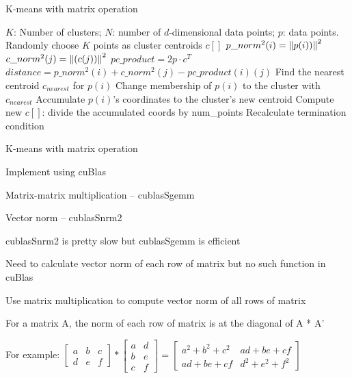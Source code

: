 \documentclass[
nopagebreaks,
style=klope,
fleqn]{powerdot}
\begin{document}
\begin{slide}{K-means with matrix operation}
  \scriptsize
  \begin{algorithmic}[1]
    \INPUT $K$: Number of clusters; $N$: number of $d$-dimensional data points; $p$: data points.
     \label{alg:pm}
    \State Randomly choose $K$ points as cluster centroids $c[]$
    \State $p\_norm^2(i) = \left\lVert p(i))\right\rVert^2$
    \EndFor
    \State $c\_norm^2(j) = \left\lVert(c(j))\right\rVert^2$
    \EndFor
    \State $pc\_product = 2 p \cdot c^T$
    \State $distance = p\_norm^2(i) + c\_norm^2(j) - pc\_product(i)(j)$
    \EndFor
    \State Find the nearest centroid $c_{nearest}$ for $p(i)$
    \State Change membership of $p(i)$ to the cluster with $c_{nearest}$
    \State Accumulate $p(i)$'s coordinates to the cluster's new centroid
    \EndParFor
    \State Compute new $c[]$: divide the accumulated coords by num\_points
    \State Recalculate termination condition
    \EndWhile
    \EndFunction
  \end{algorithmic}
\end{slide}

\begin{slide}{K-means with matrix operation}
  \begin{compactitem}
  \item{Implement using cuBlas}
  \item{Matrix-matrix multiplication -- cublasSgemm}
  \item{Vector norm -- cublasSnrm2}
  \item{cublasSnrm2 is pretty slow but cublasSgemm is efficient
    \begin{compactitem}
    \item{Need to calculate vector norm of each row of matrix but no such function in cuBlas}
    \end{compactitem}
  }
  \item{Use matrix multiplication to compute vector norm of all rows of matrix
    \begin{compactitem}
    \item{For a matrix A, the norm of each row of matrix is at the diagonal of A * A'}
    \item{For example: 
      $
      \begin{bmatrix}
        a & b & c\\
        d & e & f
      \end{bmatrix}
      *
      \begin{bmatrix}
        a & d \\
        b & e \\
        c & f
      \end{bmatrix}
      =
      \begin{bmatrix}
        a^2+b^2+c^2 & ad + be + cf \\
        ad + be + cf & d^2 + e^2 + f^2
      \end{bmatrix}
      $
    }  
    \end{compactitem}
  } 
  \end{compactitem}
\end{slide}
\end{document}
